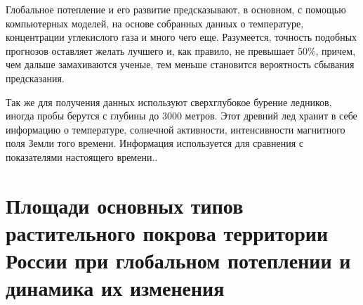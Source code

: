 \documentclass[a4paper,12pt]{ncc}
\begin{document}
 Глобальное потепление и его развитие предсказывают, в основном, с помощью компьютерных моделей, на основе собранных данных о температуре, концентрации углекислого газа и много чего еще. Разумеется, точность подобных прогнозов оставляет желать лучшего и, как правило, не превышает 50\%, причем, чем дальше замахиваются ученые, тем меньше становится вероятность сбывания предсказания.

Так же для получения данных используют сверхглубокое бурение ледников, иногда пробы берутся с глубины до 3000 метров. Этот древний лед хранит в себе информацию о температуре, солнечной активности, интенсивности магнитного поля Земли того времени. Информация используется для сравнения с показателями настоящего времени.\cite[Елдышев]{eldyshev-2009}.


 \section{Площади основных типов растительного покрова территории России при глобальном потеплении и динамика их изменения}
 \label{sec:section}
 
\end{document}

